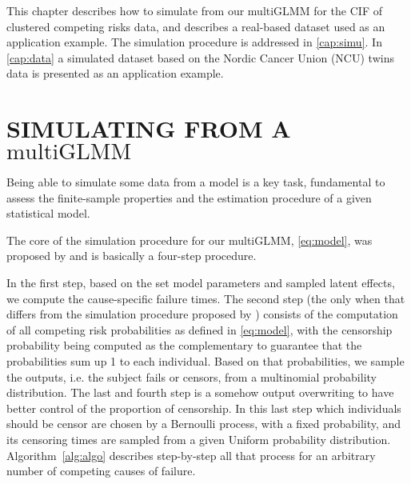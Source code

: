 This chapter describes how to simulate from our multiGLMM for the CIF of
clustered competing risks data, and describes a real-based dataset used
as an application example. The simulation procedure is addressed in
\autoref{cap:simu}. In \autoref{cap:data} a simulated dataset based on
the Nordic Cancer Union (NCU) twins data is presented as an application
example.

\section{SIMULATING FROM A \(\text{multiGLMM}\)}
\label{cap:simu}

Being able to simulate some data from a model is a key task, fundamental
to assess the finite-sample properties and the estimation procedure of a
given statistical model.

The core of the simulation procedure for our multiGLMM,
\autoref{eq:model}, was proposed by  and is
basically a four-step procedure.

In the first step, based on the set model parameters and sampled latent
effects, we compute the cause-specific failure times. The second step
(the only when that differs from the simulation procedure proposed by
) consists of the computation of all competing risk
probabilities as defined in \autoref{eq:model}, with the censorship
probability being computed as the complementary to guarantee that the
probabilities sum up 1 to each individual. Based on that probabilities,
we sample the outputs, i.e. the subject fails or censors, from a
multinomial probability distribution. The last and fourth step is a
somehow output overwriting to have better control of the proportion of
censorship. In this last step which individuals should be censor are
chosen by a Bernoulli process, with a fixed probability, and its
censoring times are sampled from a given Uniform probability
distribution. Algorithm~\ref{alg:algo} describes step-by-step all that
process for an arbitrary number of competing causes of failure.

